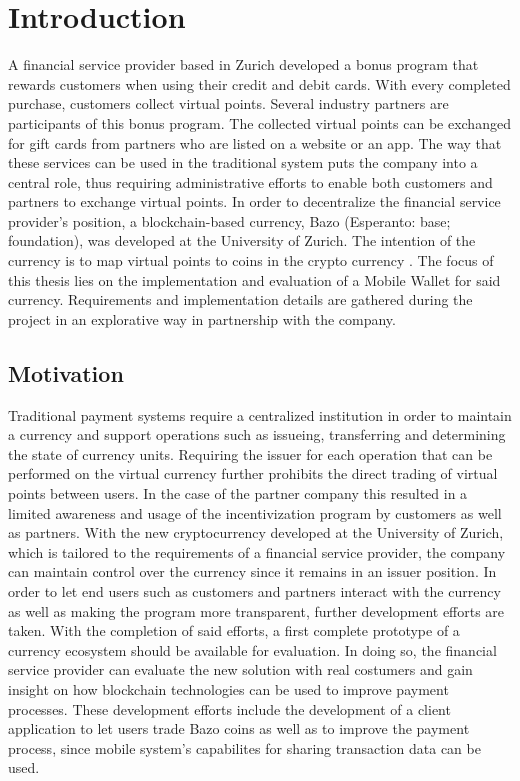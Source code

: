 \chapter{Introduction}

A financial service provider based in Zurich developed a bonus program that rewards customers when using their credit and debit cards. With every completed purchase, customers collect virtual points. Several industry partners are participants of this bonus program. The collected virtual points can be exchanged for gift cards from partners who are listed on a website or an app. The way that these services can be used in the traditional system puts the company into a central role, thus requiring administrative efforts to enable both customers and partners to exchange virtual points. In order to decentralize the financial service provider's position, a blockchain-based currency, Bazo (Esperanto: base; foundation), was developed at the University of Zurich. The intention of the currency is to map virtual points to coins in the crypto currency \cite{lisg}.
The focus of this thesis lies on the implementation and evaluation of a Mobile Wallet for said currency. Requirements and implementation details are gathered during the project in an explorative way in partnership with the company.
\section{Motivation}
Traditional payment systems require a centralized institution in order to maintain a currency and support operations such as issueing, transferring and determining the state of currency units. Requiring the issuer for each operation that can be performed on the virtual currency further prohibits the direct trading of virtual points between users.
In the case of the partner company this resulted in a limited awareness and usage of the incentivization program by customers as well as partners.
With the new cryptocurrency developed at the University of Zurich, which is tailored to the requirements of a financial service provider, the company can maintain control over the currency since it remains in an issuer position. In order to let end users such as customers and partners interact with the currency as well as making the program more transparent, further development efforts are taken. With the completion of said efforts, a first complete prototype of a currency ecosystem should be available for evaluation. In doing so, the financial service provider can evaluate the new solution with real costumers and gain insight on how blockchain technologies can be used to improve payment processes. These development efforts include the development of a client application to let users trade Bazo coins as well as to improve the payment process, since mobile system's capabilites for sharing transaction data can be used.
